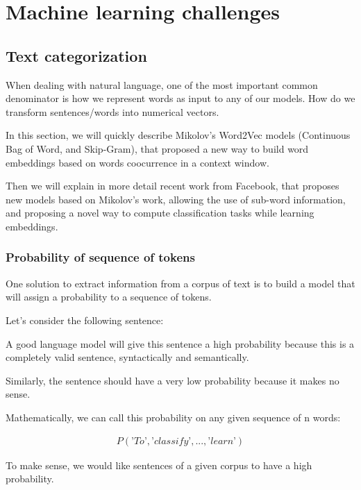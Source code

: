 \chapter{Machine learning challenges}
\label{cha:results}


\section{Text categorization}

When dealing with natural language, one of the most important common denominator is how we represent words as input to any of our models. How do we transform sentences/words into numerical vectors.

In this section, we will quickly describe Mikolov's Word2Vec models (Continuous Bag of Word, and Skip-Gram), that proposed a new way to build word embeddings based on words coocurrence in a context window.

Then we will explain in more detail recent work from Facebook, that proposes new models based on Mikolov's work, allowing the use of sub-word information, and proposing a novel way to compute classification tasks while learning embeddings.

\subsection{Probability of sequence of tokens}

One solution to extract information from a corpus of text is to build a model that will assign a probability to a sequence of tokens. 

Let's consider the following sentence: 

A good language model will give this sentence a high probability because this is a completely valid sentence, syntactically and semantically.

Similarly, the sentence  should have a very low probability because it makes no sense. 

Mathematically, we can call this probability on any given sequence of n words:

\begin{align}
	P(\textit{'To'},\textit{'classify'}, ..., \textit{'learn'})
\end{align}

To make sense, we would like sentences of a given corpus to have a high probability.

